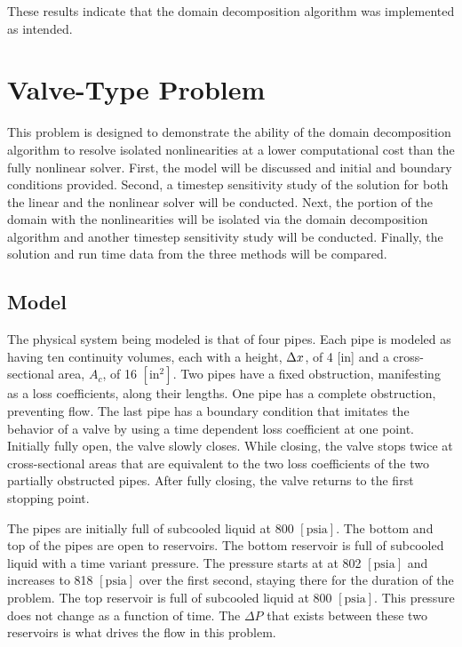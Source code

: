 These results indicate that the domain decomposition algorithm was implemented as intended.

\section{Valve-Type Problem}
\label{sect:valveProblem}

This problem is designed to demonstrate the ability of the domain decomposition algorithm to resolve isolated nonlinearities at a lower computational cost than the fully nonlinear solver. 
First, the model will be discussed and initial and boundary conditions provided.
Second, a timestep sensitivity study of the solution for both the linear and the nonlinear solver will be conducted.
Next, the portion of the domain with the nonlinearities will be isolated via the domain decomposition algorithm and another timestep sensitivity study will be conducted.
Finally, the solution and run time data from the three methods will be compared.

\subsection{Model}
\label{subsect:valveModel}

The physical system being modeled is that of four pipes.
Each pipe is modeled as having ten continuity volumes, each with a height, $\dx{}$, of 4 [in] and a cross-sectional area, $ A_{c} $, of 16 $[\text{in}^{2}]$.
Two pipes have a fixed obstruction, manifesting as a loss coefficients, along their lengths.
One pipe has a complete obstruction, preventing flow.
The last pipe has a boundary condition that imitates the behavior of a valve by using a  time dependent loss coefficient at one point.
Initially fully open, the valve slowly closes.
While closing, the valve stops twice at cross-sectional areas that are equivalent to the two loss coefficients of the two partially obstructed pipes.
After fully closing, the valve returns to the first stopping point.

The pipes are initially full of subcooled liquid at 800 $[ \text{psia}] $.
The bottom and top of the pipes are open to reservoirs.
The bottom reservoir is full of subcooled liquid with a time variant pressure.
The pressure starts at at 802 $[ \text{psia} ] $ and increases to 818 $[ \text{psia}]$ over the first second, staying there for the duration of the problem.
The top reservoir is full of subcooled liquid at 800 $[\text{psia} ] $.
This pressure does not change as a function of time.
The $\Delta P$ that exists between these two reservoirs is what drives the flow in this problem.

